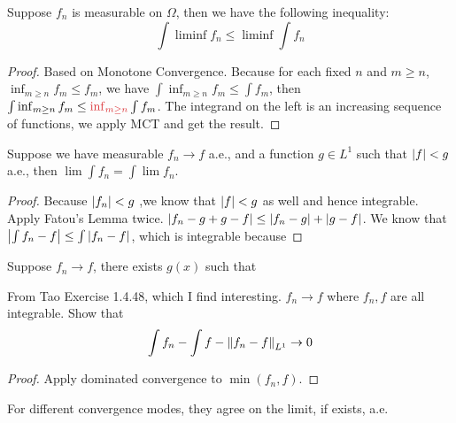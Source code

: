 \begin{thm}
    Suppose \(f_{n}\) is measurable on \(\Omega\), then we have the following inequality:
    \begin{equation*}
        \int \liminf f_{n}\leq \liminf \int f_{n} 
    \end{equation*}
\end{thm}
\begin{proof}
    Based on Monotone Convergence. Because for each fixed \(n\) and \(m \geq n\), \(\inf_{m\geq n} f_{m} \leq f_{m}\), we have \(\int \inf_{m\geq n} f_{m} \leq \int f_{m}\), then \(\int \inf_{m\geq n} f_{m} \leq \red{\inf_{m \geq n}}\int f_{m}\). The integrand on the left is an increasing sequence of functions, we apply MCT and get the result. 
\end{proof}

\begin{thm}
    Suppose we have measurable \(f_{n} \to f\) a.e., and a function \(g \in L^{1}\) such that \(\abs{f} < g\) a.e., then \(\lim \int f_{n} = \int \lim f_{n}\). 
\end{thm}

\begin{proof}
    Because \(\abs{f_{n}} < g\) ,we know that \(\abs{f} < g\) as well and hence integrable.
    Apply Fatou's Lemma twice. \(\abs{f_{n} - g + g - f} \leq \abs{f_{n} - g} + \abs{g - f}\). 
    We know that \(\abs{\int f_{n} - f} \leq \int \abs{f_{n} - f} \), which is integrable because  
\end{proof}

\begin{thm}
    Suppose \(f_{n} \to f\), there exists \(g(x)\) such that 
\end{thm}
\begin{proposition}
    From Tao Exercise 1.4.48, which I find interesting. \(f_{n} \to f\) where \(f_{n}, f\) are all integrable. Show that 
    \begin{equation*}
        \int f_{n} - \int f - \norm{f_{n} - f}_{L^{1}} \to 0
    \end{equation*}
\end{proposition}
\begin{proof}
    Apply dominated convergence to \(\min(f_{n}, f)\).
\end{proof}

\begin{proposition}
    For different convergence modes, they agree on the limit, if exists, a.e. 
\end{proposition}


